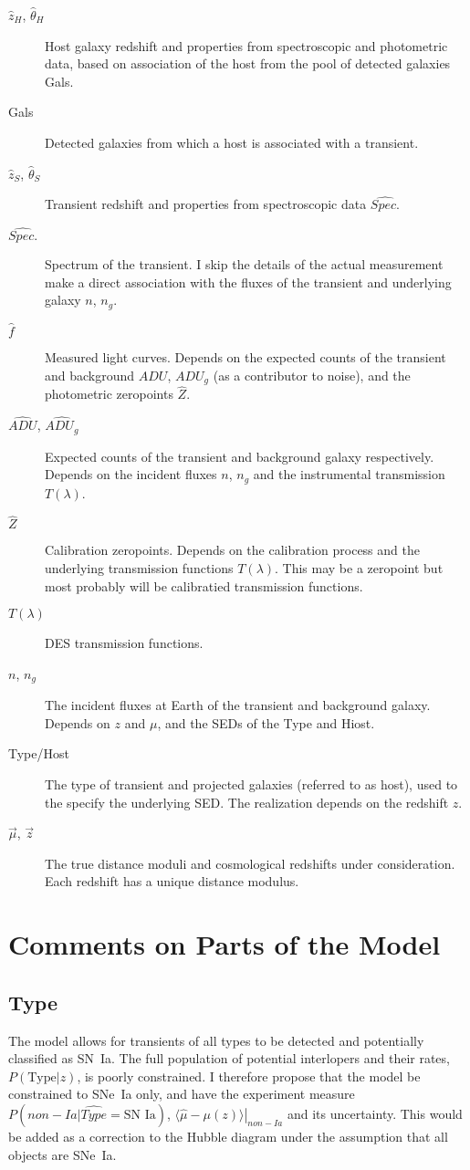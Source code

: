 \documentclass[preprint]{aastex}
\begin{document}
\begin{description}
\item[$\hat{z}_H$, $\hat{\theta}_H$] Host galaxy redshift and properties from spectroscopic
and photometric data, based on association
of the host from the pool of detected galaxies Gals.
\item[Gals] Detected galaxies from which a host is associated with a transient.
\item[$\hat{z}_S$, $\hat{\theta}_S$] Transient redshift and properties from
spectroscopic data $\hat{\mathit{Spec.}}$
\item[ $\hat{\mathit{Spec.}}$] Spectrum of the transient. I skip the details of the actual measurement  make a direct association
with the fluxes of the transient and underlying galaxy $n$, $n_g$.
\item[$\hat{f}$] Measured light curves.  Depends on the expected counts of
the transient and background $\mathit{ADU}$, $\mathit{ADU}_g$
(as a contributor to noise), and the photometric zeropoints $\hat{Z}$.
\item[$\hat{\mathit{ADU}}$, $\hat{\mathit{ADU}_g}$]  Expected counts
of the transient and background galaxy respectively.  Depends
on the incident fluxes $n$, $n_g$ and the instrumental
transmission $T(\lambda)$.
\item[$\hat{Z}$] Calibration zeropoints.  Depends on the calibration process
and the underlying transmission functions $T(\lambda)$.  This may be a zeropoint
but most probably will be calibratied transmission functions.
\item[$T(\lambda)$] DES transmission functions.
\item[$n$, $n_g$] The incident fluxes at Earth of the transient and background
galaxy.  Depends on  $z$ and $\mu$, and the SEDs of the Type and Hiost.
\item[Type/Host]  The type of transient and projected galaxies (referred to as host),
used to the specify the
underlying SED.  The realization depends on the redshift $z$.
\item[$\vec{\mu}$, $\vec{z}$]  The true distance moduli and cosmological redshifts under
consideration.  Each redshift has a unique distance modulus.
\end{description}

\section{Comments on Parts of the Model}

\subsection{Type}
The model allows for transients of all types to be detected
and potentially classified as SN~Ia. 
The full population of potential interlopers and their rates, $P(\text{Type} | z)$,
is poorly constrained.
I therefore propose that the model be constrained to SNe~Ia only,
and have the experiment measure
$P(non-Ia |  \hat{\mathit{Type}}=\text{SN~Ia})$,
$\left. \langle \hat{\mu}-\mu(z)\rangle \right|_{non-Ia}$ and its uncertainty.
This would be added as a correction to the Hubble diagram under the assumption
that all objects are SNe~Ia.
\end{document}
